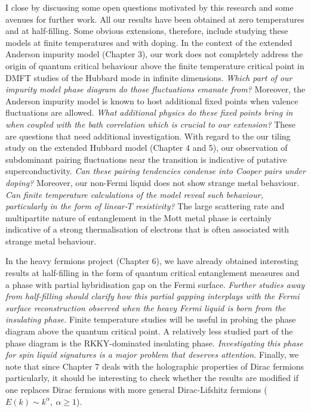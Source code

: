 I close by discussing some open questions motivated by this research and some avenues for further work. All our results have been obtained at zero temperatures and at half-filling. Some obvious extensions, therefore, include studying these models at finite temperatures and with doping. In the context of the extended Anderson impurity model (Chapter 3), our work does not completely address the origin of quantum critical behaviour above the finite temperature critical point in DMFT studies of the Hubbard mode in infinite dimensions. {\it Which part of our  impurity model phase diagram do those fluctuations emanate from?} Moreover, the Anderson impurity model is known to host additional fixed points when valence fluctuations are allowed. {\it What additional physics do these fixed points bring in when coupled with the bath correlation which is crucial to our extension?} These are questions that need additional investigation. With regard to the our tiling study on the extended Hubbard model (Chapter 4 and 5), our observation of subdominant pairing fluctuations near the transition is indicative of putative superconductivity. {\it Can these pairing tendencies condense into Cooper pairs under doping?} Moreover, our non-Fermi liquid does not show strange metal behaviour. {\it Can finite temperature calculations of the model reveal such behaviour, particularly in the form of linear-\(T\) resistivity?} The large scattering rate and multipartite nature of entanglement in the Mott metal phase is certainly indicative of a strong thermalisation of electrons that is often associated with strange metal behaviour.

In the heavy fermions project (Chapter 6), we have already obtained interesting results at half-filling in the form of quantum critical entanglement measures and a phase with partial hybridisation gap on the Fermi surface. {\it Further studies away from half-filling should clarify how this partial gapping interplays with the Fermi surface reconstruction observed when the heavy Fermi liquid is born from the insulating phase.} Finite temperature studies will be useful in probing the phase diagram above the quantum critical point. A relatively less studied part of the phase diagram is the RKKY-dominated insulating phase. {\it Investigating this phase for spin liquid signatures is a major problem that deserves attention.} Finally, we note that since Chapter 7 deals with the holographic properties of Dirac fermions particularly, it should be interesting to check whether the results are modified if one replaces Dirac fermions with more general Dirac-Lifshitz fermions (\(E(k) \sim k^\alpha,~\alpha\geq 1\)).
